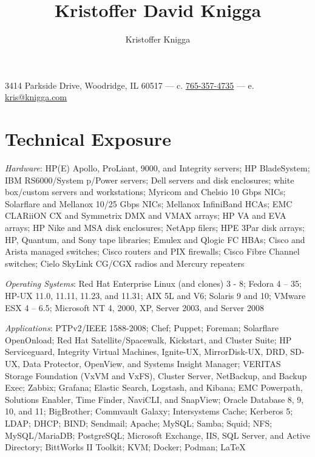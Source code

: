 \documentclass[9pt]{extarticle} %
\title{Kristoffer David Knigga}
\author{Kristoffer Knigga}
\begin{document}



3414 Parkside Drive, Woodridge, IL 60517 \hfill --- \hfill c. \href{tel:765-357-4735}{765-357-4735} \hfill --- \hfill e. \href{mailto:kris@knigga.com}{kris@knigga.com}


\section{Technical Exposure}

\textit{Hardware}: HP(E) Apollo, ProLiant, 9000, and Integrity servers; HP BladeSystem; IBM RS6000/System p/Power servers; Dell servers and disk enclosures; white box/custom servers and workstations; Myricom and Chelsio 10 Gbps NICs; Solarflare and Mellanox 10/25 Gbps NICs; Mellanox InfiniBand HCAs; EMC CLARiiON CX and Symmetrix DMX and VMAX arrays; HP VA and EVA arrays; HP Nike and MSA disk enclosures; NetApp filers; HPE 3Par disk arrays; HP, Quantum, and Sony tape libraries; Emulex and Qlogic FC HBAs; Cisco and Arista managed switches; Cisco routers and PIX firewalls; Cisco Fibre Channel switches; Cielo SkyLink CG/CGX radios and Mercury repeaters
\bigskip

\textit{Operating Systems}: Red Hat Enterprise Linux (and clones) 3 - 8; Fedora 4 -- 35; HP-UX 11.0, 11.11, 11.23, and 11.31; AIX 5L and V6; Solaris 9 and 10; VMware ESX 4 -- 6.5; Microsoft NT 4, 2000, XP, Server 2003, and Server 2008

\bigskip

\textit{Applications}: PTPv2/IEEE 1588-2008; Chef; Puppet; Foreman; Solarflare OpenOnload; Red Hat Satellite/Spacewalk, Kickstart, and Cluster Suite; HP Serviceguard, Integrity Virtual Machines, Ignite-UX, MirrorDisk-UX, DRD, SD-UX, Data Protector, OpenView, and Systems Insight Manager; VERITAS Storage Foundation (VxVM and VxFS), Cluster Server, NetBackup, and Backup Exec; Zabbix; Grafana; Elastic Search, Logstash, and Kibana; EMC Powerpath, Solutions Enabler, Time Finder, NaviCLI, and SnapView; Oracle Database 8, 9, 10, and 11; BigBrother; Commvault Galaxy; Intersystems Cache; Kerberos 5; LDAP; DHCP; BIND; Sendmail; Apache; MySQL; Samba; Squid; NFS; MySQL/MariaDB; PostgreSQL; Microsoft Exchange, IIS, SQL Server, and Active Directory; BittWorks II Toolkit; KVM; Docker; Podman; \LaTeX{}
\end{document}
